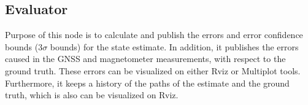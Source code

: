 \subsection{Evaluator}
Purpose of this node is to calculate and publish the errors and error confidence bounds (3$\sigma$ bounds) for the state estimate. In addition, it publishes the errors caused in the \gls{GNSS} and magnetometer measurements, with respect to the ground truth. These errors can be visualized on either Rviz or Multiplot tools. Furthermore, it keeps a history of the paths of the estimate and the ground truth, which is also can be visualized on Rviz.



